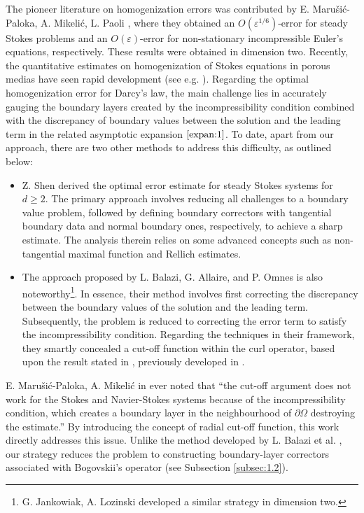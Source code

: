 \documentclass[13pt,CJK]{article}
\theoremstyle{plain}                       %
\theoremstyle{remark}
\numberwithin{equation}{section}
\begin{document}
The pioneer literature on homogenization errors was contributed by
E. Maru\v{s}i\'{c}-Paloka, A. Mikeli\'{c}, L. Paoli  \cite{Marusi-Mikelic96,Mikelic-Paoli99}, where they obtained an $O(\varepsilon^{1/6})$-error
for steady Stokes problems and an $O(\varepsilon)$-error for non-stationary incompressible Euler's equations,
respectively. These results were obtained in dimension two.
Recently, the quantitative estimates on homogenization of Stokes equations  in porous medias have seen rapid development (see e.g. \cite{Balazi-Allaire-Omnes24,Jankowiak-Lozinski24,Jing20,Jing-Lu-Prange24,
Lu21,Shen20,Shen22,Shen23}).
Regarding the optimal homogenization error for Darcy's law, the main challenge lies in accurately gauging the boundary layers created by the incompressibility condition combined with the discrepancy of boundary values between the solution and the leading term in the related asymptotic expansion $\eqref{expan:1}$.
To date, apart from our approach, there are two other methods to address this difficulty, as outlined below:
\begin{itemize}
  \item[1.] Z. Shen \cite{Shen20} derived the optimal error estimate for steady Stokes
systems for $d\geq 2$. The primary approach involves reducing all challenges to a boundary value problem, followed by defining
boundary correctors with tangential boundary data and normal boundary ones, respectively, to achieve a sharp estimate. The analysis therein  relies on some advanced concepts such as non-tangential maximal function and Rellich estimates.

  \item[2.]
  The approach proposed by
  L. Balazi, G. Allaire, and P. Omnes \cite{Balazi-Allaire-Omnes24}
  is also noteworthy\footnote{G. Jankowiak, A. Lozinski \cite{Jankowiak-Lozinski24} developed a similar strategy in dimension two.}.  In essence, their method involves first correcting the discrepancy between the boundary values of the solution and the leading term. Subsequently, the problem is reduced to correcting the error term to satisfy the incompressibility condition.
  Regarding the techniques in their framework, they smartly concealed a cut-off function within the curl operator, based upon
  the result stated in \cite[Lemma 4.10]{Balazi-Allaire-Omnes24}, previously developed in \cite{Dacorogna02}.
\end{itemize}

E. Maru\v{s}i\'{c}-Paloka, A. Mikeli\'{c} in  \cite[pp.2]{Marusi-Mikelic96}
ever noted that ``the cut-off argument
does not work for the Stokes and Navier-Stokes systems because of the incompressibility condition, which creates a boundary
layer in the neighbourhood of $\partial\Omega$ destroying the estimate.''
By introducing the concept of radial cut-off function,
this work directly addresses this issue. Unlike the method
developed by L. Balazi et al. \cite{Balazi-Allaire-Omnes24,Jankowiak-Lozinski24},
our strategy reduces the problem to constructing boundary-layer correctors associated with Bogovskii's operator (see Subsection \ref{subsec:1.2}).
\end{document}
